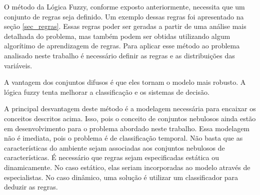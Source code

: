 O método da Lógica Fuzzy, conforme exposto anteriormente, necessita que um
conjunto de regras seja definido. Um exemplo dessas regras foi apresentado na
seção \ref{sec_regras}. Essas regras poder ser geradas a partir de uma
análise mais detalhada do problema, mas também podem ser obtidas utilizando
algum algorítimo de aprendizagem de regras. Para aplicar esse método ao problema
analisado neste trabalho é necessário definir as regras e as distribuições das
variáveis.

A vantagem dos conjuntos difusos é que eles tornam o modelo mais robusto. A
lógica fuzzy tenta melhorar a classificação e os sistemas de decisão.

A principal desvantagem deste método é a modelagem necessária para encaixar os
conceitos descritos acima. Isso, pois o conceito de conjuntos nebulosos ainda
estão em desenvolvimento para o problema abordado neste trabalho. Essa modelagem
não é imediata, pois o problema é de classificação temporal. Não basta que as
características do ambiente sejam associadas aos conjuntos nebulosos de
características. É necessário que regras sejam especificadas estática ou
dinamicamente. No caso estático, elas seriam incorporadas ao modelo através de
especialistas. No caso dinâmico, uma solução é utilizar um classificador para
deduzir as regras.

